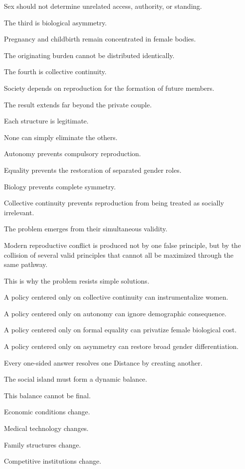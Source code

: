 Sex should not determine unrelated access, authority, or standing.

The third is biological asymmetry.

Pregnancy and childbirth remain concentrated in female bodies.

The originating burden cannot be distributed identically.

The fourth is collective continuity.

Society depends on reproduction for the formation of future members.

The result extends far beyond the private couple.

Each structure is legitimate.

None can simply eliminate the others.

Autonomy prevents compulsory reproduction.

Equality prevents the restoration of separated gender roles.

Biology prevents complete symmetry.

Collective continuity prevents reproduction from being treated as socially irrelevant.

The problem emerges from their simultaneous validity.

Modern reproductive conflict is produced not by one false principle, but by the collision of several valid principles that cannot all be maximized through the same pathway.

This is why the problem resists simple solutions.

A policy centered only on collective continuity can instrumentalize women.

A policy centered only on autonomy can ignore demographic consequence.

A policy centered only on formal equality can privatize female biological cost.

A policy centered only on asymmetry can restore broad gender differentiation.

Every one-sided answer resolves one Distance by creating another.

The social island must form a dynamic balance.

This balance cannot be final.

Economic conditions change.

Medical technology changes.

Family structures change.

Competitive institutions change.


